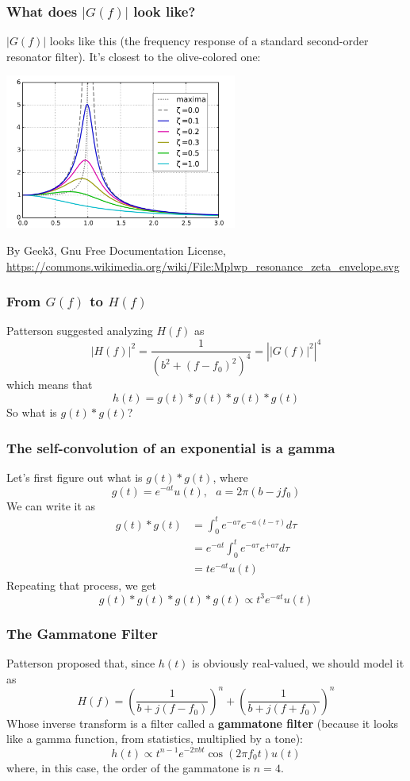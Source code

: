 \documentclass{beamer}
\begin{document}
\begin{frame}
  \frametitle{What does $|G(f)|$ look like?}

  $|G(f)|$ looks like this (the frequency response of a standard second-order
  resonator filter). It's closest to the olive-colored one:

  \centerline{\includegraphics[height=2in]{Mplwp_resonance_zeta_envelope.png}}
  \begin{tiny}
    By Geek3, Gnu Free Documentation License,
    \url{https://commons.wikimedia.org/wiki/File:Mplwp_resonance_zeta_envelope.svg}
  \end{tiny}
\end{frame}

\begin{frame}
  \frametitle{From $G(f)$ to $H(f)$}

  Patterson suggested analyzing $H(f)$ as
  \[
  |H(f)|^2 = \frac{1}{(b^2+(f-f_0)^2)^4}= \left||G(f)|^2\right|^4
  \]
  which means that
  \[
  h(t) = g(t)\ast g(t)\ast g(t)\ast g(t)
  \]
  So what is $g(t)\ast g(t)$?
\end{frame}

\begin{frame}
  \frametitle{The self-convolution of an exponential is  a gamma}

  Let's first figure out what is $g(t)\ast g(t)$, where 
  \[
  g(t)=e^{-at}u(t),~~~a=2\pi (b-jf_0)
  \]
  We can write it as
  \begin{align*}
    g(t)\ast g(t) &= \int_0^t e^{-a\tau} e^{-a(t-\tau)} d\tau\\
    &= e^{-at} \int_0^t e^{-a\tau} e^{+a\tau} d\tau\\
    &= te^{-at} u(t)
  \end{align*}
  Repeating that process, we get
  \[
  g(t)\ast g(t)\ast g(t)\ast g(t) \propto t^3 e^{-at}u(t)
  \]
\end{frame}

\begin{frame}
  \frametitle{The Gammatone Filter}

  Patterson proposed that, since $h(t)$ is obviously real-valued, we
  should model it as
  \[
  H(f) = \left(\frac{1}{b + j(f-f_0)}\right)^n + \left(\frac{1}{b + j(f+f_0)}\right)^n
  \]
  Whose inverse transform is a filter called a {\bf gammatone filter}
  (because it looks like a gamma function, from statistics, multiplied
  by a tone):
  \[
  h(t) \propto t^{n-1} e^{-2\pi bt}\cos(2\pi f_0 t)u(t)
  \]
  where, in this case, the order of the gammatone is $n=4$.
\end{frame}
\end{document}
